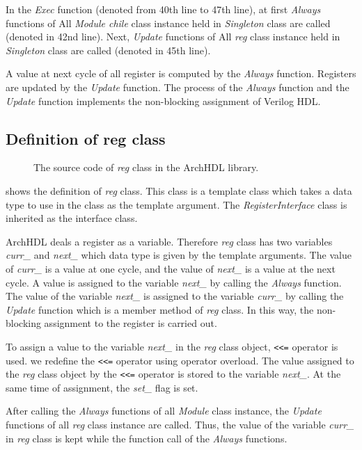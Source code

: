 In the \textit{Exec} function (denoted from 40th line to 47th line), at first \textit{Always} functions of All \textit{Module chile} class instance held in \textit{Singleton} class are called (denoted in 42nd line).
Next, \textit{Update} functions of All \textit{reg} class instance held in \textit{Singleton} class are called (denoted in 45th line).

A value at next cycle of all register is computed by the \textit{Always} function.
Registers are updated by the \textit{Update} function.
The process of the \textit{Always} function and the \textit{Update} function implements the non-blocking assignment of Verilog HDL.

\subsection{Definition of reg class}

\begin{figure}[tp]
 
 \caption{The source code of \textit{reg} class in the ArchHDL library.}
 \label{src:reg}
\end{figure}

 shows the definition of \textit{reg} class.
This class is a template class which takes a data type to use in the class as the template argument.
The \textit{RegisterInterface} class is inherited as the interface class.

ArchHDL deals a register as a variable.
Therefore \textit{reg} class has two variables \textit{curr\_} and \textit{next\_} which data type is given by the template arguments.
The value of \textit{curr\_} is a value at one cycle, and the value of \textit{next\_} is a value at the next cycle.
A value is assigned to the variable \textit{next\_} by calling the \textit{Always} function.
The value of the variable \textit{next\_} is assigned to the variable \textit{curr\_} by calling the \textit{Update} function which is a member method of \textit{reg} class.
In this way, the non-blocking assignment to the register is carried out.

To assign a value to the variable \textit{next\_} in the \textit{reg} class object, \verb`<<=` operator is used.
we redefine the \verb`<<=` operator using operator overload.
The value assigned to the \textit{reg} class object by the \verb`<<=` operator is stored to the variable \textit{next\_}.
At the same time of assignment, the \textit{set\_} flag is set.

After calling the \textit{Always} functions of all \textit{Module} class instance, the \textit{Update} functions of all \textit{reg} class instance are called.
Thus, the value of the variable \textit{curr\_} in \textit{reg} class is kept while the function call of the \textit{Always} functions.

